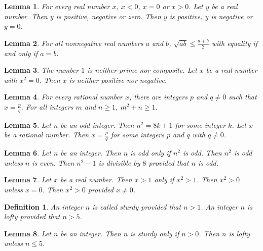\documentclass{article}
\newtheorem{lemma}{Lemma}
\newtheorem{definition}{Definition}
\begin{document}
\begin{lemma}\label{or-lists}
For every real number $x$, $x<0$, $x=0$ or $x>0$. Let $y$ be a real number. Then $y$ is positive, negative or zero. Then $y$ is positive, $y$ is negative or $y=0$.
\end{lemma}

\begin{lemma}\label{equality-without-comma}
For all nonnegative real numbers $a$ and $b$, $\sqrt{ab}\le\frac{a+b}{2}$ with equality if and only if $a=b$.
\end{lemma}

\begin{lemma}\label{neither-nor}
The number $1$ is neither prime nor composite. Let $x$ be a real number with $x^2=0$. Then $x$ is neither positive nor negative.
\end{lemma}

\begin{lemma}\label{condition-of-last-name}
For every rational number $x$, there are integers $p$ and $q\ne0$ such that $x=\frac{p}{q}$. For all integers $m$ and $n\ge1$, $m^2+n\ge1$.
\end{lemma}

\begin{lemma}\label{for-some}
Let $n$ be an odd integer. Then $n^2=8k+1$ for some integer $k$. Let $x$ be a rational number. Then $x=\frac{p}{q}$ for some integers $p$ and $q$ with $q\ne0$.
\end{lemma}

\begin{lemma}\label{conditions-after}
Let $n$ be an integer. Then $n$ is odd only if $n^2$ is odd. Then $n^2$ is odd unless $n$ is even. Then $n^2-1$ is divisible by $8$ provided that $n$ is odd.
\end{lemma}

\begin{lemma}\label{formula-conditions-after}
Let $x$ be a real number. Then $x>1$ only if $x^2>1$. Then $x^2>0$ unless $x=0$. Then $x^2>0$ provided $x\ne0$.
\end{lemma}

\begin{definition}\label{named-provided}
An integer $n$ is called sturdy provided that $n>1$. An integer $n$ is lofty provided that $n>5$.
\end{definition}

\begin{lemma}\label{conditions-after-names}
Let $n$ be an integer. Then $n$ is sturdy only if $n>0$. Then $n$ is lofty unless $n\le5$.
\end{lemma}
\end{document}
